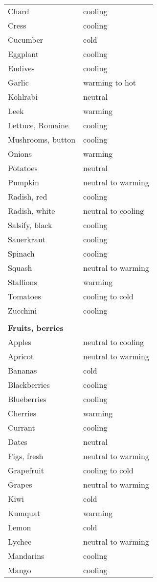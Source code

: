 \documentclass[../main.tex]{subfiles}
\begin{document}
\begin{longtable}{ll}
Chard & cooling \\
Cress & cooling \\
Cucumber & cold \\
Eggplant & cooling \\
Endives & cooling \\
Garlic & warming to hot \\
Kohlrabi & neutral \\
Leek & warming \\
Lettuce, Romaine & cooling \\
Mushrooms, button & cooling \\
Onions & warming \\
Potatoes & neutral \\
Pumpkin & neutral to warming \\
Radish, red & cooling \\
Radish, white & neutral to cooling \\
Salsify, black & cooling \\
Sauerkraut & cooling \\
Spinach & cooling \\
Squash & neutral to warming \\
Stallions & warming \\
Tomatoes & cooling to cold \\
Zucchini & cooling \\
 \\
\multicolumn{2}{l}{\textbf{Fruits, berries}} \\
Apples & neutral to cooling \\
Apricot & neutral to warming \\
Bananas & cold \\
Blackberries & cooling  \\
Blueberries & cooling  \\
Cherries & warming \\
Currant & cooling  \\
Dates & neutral \\
Figs, fresh & neutral to warming \\
Grapefruit & cooling to cold \\
Grapes & neutral to warming \\
Kiwi & cold \\
Kumquat & warming \\
Lemon & cold \\
Lychee & neutral to warming \\
Mandarins & cooling  \\
Mango & cooling  \\

\end{longtable}
\end{document}
